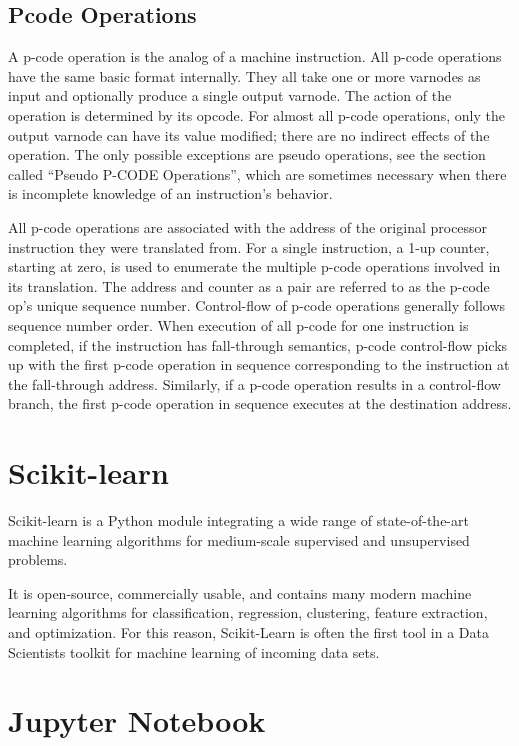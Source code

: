 \subsection{Pcode Operations}
A p-code operation is the analog of a machine instruction. All p-code operations have the same basic format internally. They all take one or more varnodes as input and optionally produce a single output varnode. The action of the operation is determined by its opcode. For almost all p-code operations, only the output varnode can have its value modified; there are no indirect effects of the operation. The only possible exceptions are pseudo operations, see the section called “Pseudo P-CODE Operations”, which are sometimes necessary when there is incomplete knowledge of an instruction's behavior.

All p-code operations are associated with the address of the original processor instruction they were translated from. For a single instruction, a 1-up counter, starting at zero, is used to enumerate the multiple p-code operations involved in its translation. The address and counter as a pair are referred to as the p-code op's unique sequence number. Control-flow of p-code operations generally follows sequence number order. When execution of all p-code for one instruction is completed, if the instruction has fall-through semantics, p-code control-flow picks up with the first p-code operation in sequence corresponding to the instruction at the fall-through address. Similarly, if a p-code operation results in a control-flow branch, the first p-code operation in sequence executes at the destination address.


\section{Scikit-learn}
Scikit-learn is a Python module integrating a wide range of state-of-the-art machine learning algorithms for medium-scale supervised and unsupervised problems. 

It is open-source, commercially usable, and contains many modern machine learning algorithms for classification, regression, clustering, feature extraction, and optimization.
For this reason, Scikit-Learn is often the first tool in a Data Scientists toolkit for machine learning of incoming data sets. \cite{scikit-learn}
\section{Jupyter Notebook}


